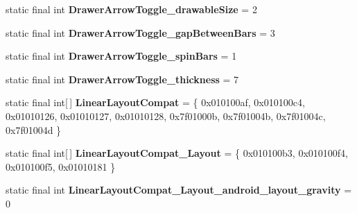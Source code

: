 \begin{DoxyCompactItemize}
\item 
\hypertarget{classandroid_1_1support_1_1v7_1_1appcompat_1_1_r_1_1styleable_ab4e5d8c4feff81f48c37f877d680e866}{}static final int {\bfseries Drawer\+Arrow\+Toggle\+\_\+drawable\+Size} = 2\label{classandroid_1_1support_1_1v7_1_1appcompat_1_1_r_1_1styleable_ab4e5d8c4feff81f48c37f877d680e866}

\item 
\hypertarget{classandroid_1_1support_1_1v7_1_1appcompat_1_1_r_1_1styleable_a6e43ac7ba6e98e7802537044437c6806}{}static final int {\bfseries Drawer\+Arrow\+Toggle\+\_\+gap\+Between\+Bars} = 3\label{classandroid_1_1support_1_1v7_1_1appcompat_1_1_r_1_1styleable_a6e43ac7ba6e98e7802537044437c6806}

\item 
\hypertarget{classandroid_1_1support_1_1v7_1_1appcompat_1_1_r_1_1styleable_a93a75bb35b9128705ac454ab5390f384}{}static final int {\bfseries Drawer\+Arrow\+Toggle\+\_\+spin\+Bars} = 1\label{classandroid_1_1support_1_1v7_1_1appcompat_1_1_r_1_1styleable_a93a75bb35b9128705ac454ab5390f384}

\item 
\hypertarget{classandroid_1_1support_1_1v7_1_1appcompat_1_1_r_1_1styleable_a4c29e2305386cfb011ab7da889aeae29}{}static final int {\bfseries Drawer\+Arrow\+Toggle\+\_\+thickness} = 7\label{classandroid_1_1support_1_1v7_1_1appcompat_1_1_r_1_1styleable_a4c29e2305386cfb011ab7da889aeae29}

\item 
\hypertarget{classandroid_1_1support_1_1v7_1_1appcompat_1_1_r_1_1styleable_a765d32873526b8c36de14b184094582d}{}static final int\mbox{[}$\,$\mbox{]} {\bfseries Linear\+Layout\+Compat} = \{ 0x010100af, 0x010100c4, 0x01010126, 0x01010127, 0x01010128, 0x7f01000b, 0x7f01004b, 0x7f01004c, 0x7f01004d \}\label{classandroid_1_1support_1_1v7_1_1appcompat_1_1_r_1_1styleable_a765d32873526b8c36de14b184094582d}

\item 
\hypertarget{classandroid_1_1support_1_1v7_1_1appcompat_1_1_r_1_1styleable_abdf078c09964c82c7af689bed5e6f564}{}static final int\mbox{[}$\,$\mbox{]} {\bfseries Linear\+Layout\+Compat\+\_\+\+Layout} = \{ 0x010100b3, 0x010100f4, 0x010100f5, 0x01010181 \}\label{classandroid_1_1support_1_1v7_1_1appcompat_1_1_r_1_1styleable_abdf078c09964c82c7af689bed5e6f564}

\item 
\hypertarget{classandroid_1_1support_1_1v7_1_1appcompat_1_1_r_1_1styleable_a41408b82afaf90814a6a867440e582f4}{}static final int {\bfseries Linear\+Layout\+Compat\+\_\+\+Layout\+\_\+android\+\_\+layout\+\_\+gravity} = 0\label{classandroid_1_1support_1_1v7_1_1appcompat_1_1_r_1_1styleable_a41408b82afaf90814a6a867440e582f4}


\end{DoxyCompactItemize}

